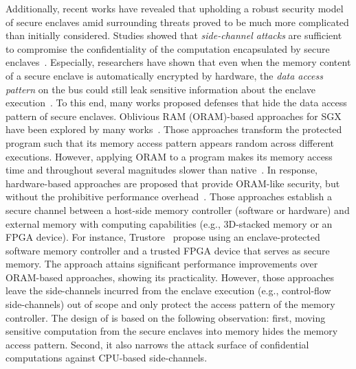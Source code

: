Additionally, recent works have revealed that upholding a robust security model of secure enclaves amid surrounding threats proved to be much more complicated than initially considered. Studies showed that \emph{side-channel attacks} are sufficient to compromise the confidentiality of the computation encapsulated by secure enclaves~\cite{sgx-cache-attack,sgx-grand-exposure,membuster}. Especially, researchers have shown that even when the memory content of a secure enclave is automatically encrypted by hardware, the \emph{data access pattern} on the bus could still leak sensitive information about the enclave execution~\cite{membuster}. To this end, many works proposed defenses that hide the data access pattern of secure enclaves. Oblivious RAM (ORAM)-based approaches for SGX have been explored by many works~\cite{obfuscuro,zerotrace,raccoon}. Those approaches transform the protected program such that its memory access pattern appears random across different executions. However, applying ORAM to a program makes its memory access time and throughout several magnitudes slower than native~\cite{obfuscuro,zerotrace}. In response, hardware-based approaches are proposed that provide ORAM-like security, but without the prohibitive performance overhead~\cite{invisimem,obfusmem,trustore}. Those approaches establish a secure channel between a host-side memory controller (software or hardware) and external memory with computing capabilities (e.g., 3D-stacked memory or an FPGA device). For instance, Trustore~\cite{trustore} propose using an enclave-protected software memory controller and a trusted FPGA device that serves as secure memory. The approach attains significant performance improvements over ORAM-based approaches, showing its practicality. However, those approaches leave the side-channels incurred from the enclave execution (e.g., control-flow side-channels) out of scope and only protect the access pattern of the memory controller. The design of \thename is based on the following observation: first, moving sensitive computation from the secure enclaves into memory hides the memory access pattern. Second, it also narrows the attack surface of confidential computations against CPU-based side-channels.

